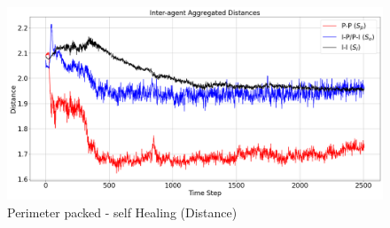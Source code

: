\documentclass[12pt,a4paper]{IEEEtran}
\begin{document}
\begin{figure}[H]
	\begin{center}
		\includegraphics[width=1.0\linewidth]{figures/Future8}
	\end{center}
	\caption{Perimeter packed - self Healing (Distance)\label{fig:future8}}
\end{figure}



\end{document}
